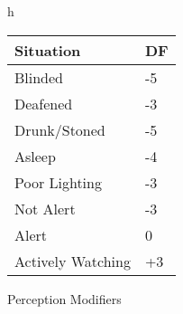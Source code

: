 \begin{SHTable}{h}
	\begin{tabular}{ll}
	Situation				&  DF \\ 
	\hline
	Blinded				     &  -5 \\
	Deafened				 &  -3 \\
	Drunk/Stoned			 &  -5 \\
	Asleep					 &  -4 \\
	Poor Lighting			 &  -3 \\
	Not Alert 				 &  -3 \\
	Alert					 &  0  \\
	Actively Watching		 & +3  \\ 
    \end{tabular}
	\caption{Perception Modifiers}\label{Table:PerceptionModifiers}
\end{SHTable}
